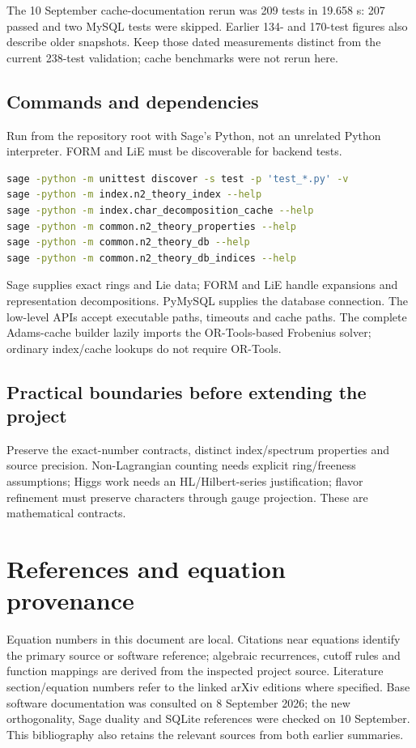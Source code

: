 \documentclass[11pt,a4paper]{article}
\numberwithin{equation}{section}
\begin{document}
The 10 September cache-documentation rerun was 209 tests in 19.658 s:
207 passed and two MySQL tests were skipped. Earlier 134- and 170-test figures
also describe older snapshots. Keep those dated measurements distinct from
the current 238-test validation; cache benchmarks were not rerun here.

\clearpage
\subsection{Commands and dependencies}
Run from the repository root with Sage's Python, not an unrelated Python
interpreter. FORM and LiE must be discoverable for backend tests.
\begin{lstlisting}[language=bash]
sage -python -m unittest discover -s test -p 'test_*.py' -v
sage -python -m index.n2_theory_index --help
sage -python -m index.char_decomposition_cache --help
sage -python -m common.n2_theory_properties --help
sage -python -m common.n2_theory_db --help
sage -python -m common.n2_theory_db_indices --help
\end{lstlisting}
Sage supplies exact rings and Lie data; FORM and LiE handle expansions and
representation decompositions. PyMySQL supplies the database connection. The
low-level APIs accept executable paths, timeouts and cache paths. The complete
Adams-cache builder lazily imports the OR-Tools-based Frobenius solver; ordinary
index/cache lookups do not require OR-Tools.

\subsection{Practical boundaries before extending the project}
Preserve the exact-number contracts, distinct index/spectrum properties and
source precision. Non-Lagrangian counting needs explicit ring/freeness assumptions;
Higgs work needs an HL/Hilbert-series justification; flavor refinement must
preserve characters through gauge projection. These are mathematical contracts.

\endgroup
\clearpage
\section*{References and equation provenance}
Equation numbers in this document are local. Citations near equations identify
the primary source or software reference; algebraic recurrences, cutoff rules
and function mappings are derived from the inspected project source. Literature
section/equation numbers refer to the linked arXiv editions where specified.
Base software documentation was consulted on 8 September 2026; the new
orthogonality, Sage duality and SQLite references were checked on 10 September. This bibliography
also retains the relevant sources from both earlier summaries.
\end{document}
